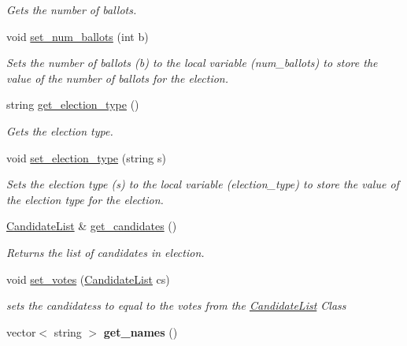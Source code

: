 \begin{DoxyCompactItemize}
\begin{DoxyCompactList}\small\item\em Gets the number of ballots. \end{DoxyCompactList}\item 
void \hyperlink{class_election_ae8f4cc654d20ae3677f01584a62d33d0}{set\+\_\+num\+\_\+ballots} (int b)
\begin{DoxyCompactList}\small\item\em Sets the number of ballots (b) to the local variable (num\+\_\+ballots) to store the value of the number of ballots for the election. \end{DoxyCompactList}\item 
string \hyperlink{class_election_ae8f6ee235effaf70966f2e603bbe90b3}{get\+\_\+election\+\_\+type} ()\hypertarget{class_election_ae8f6ee235effaf70966f2e603bbe90b3}{}\label{class_election_ae8f6ee235effaf70966f2e603bbe90b3}

\begin{DoxyCompactList}\small\item\em Gets the election type. \end{DoxyCompactList}\item 
void \hyperlink{class_election_a5d08c46134fa0e59988138258ab53eed}{set\+\_\+election\+\_\+type} (string s)
\begin{DoxyCompactList}\small\item\em Sets the election type (s) to the local variable (election\+\_\+type) to store the value of the election type for the election. \end{DoxyCompactList}\item 
\hyperlink{class_candidate_list}{Candidate\+List} \& \hyperlink{class_election_abb17fd9395b0931c5f635c2c0dd30427}{get\+\_\+candidates} ()\hypertarget{class_election_abb17fd9395b0931c5f635c2c0dd30427}{}\label{class_election_abb17fd9395b0931c5f635c2c0dd30427}

\begin{DoxyCompactList}\small\item\em Returns the list of candidates in election. \end{DoxyCompactList}\item 
void \hyperlink{class_election_a726cbdaaca392d54675954d6d86f10f0}{set\+\_\+votes} (\hyperlink{class_candidate_list}{Candidate\+List} cs)
\begin{DoxyCompactList}\small\item\em sets the candidatess to equal to the votes from the \hyperlink{class_candidate_list}{Candidate\+List} Class \end{DoxyCompactList}\item 
vector$<$ string $>$ {\bfseries get\+\_\+names} ()\hypertarget{class_election_a0100bf20e0c74b160867ac15d814a406}{}\label{class_election_a0100bf20e0c74b160867ac15d814a406}


\end{DoxyCompactItemize}
